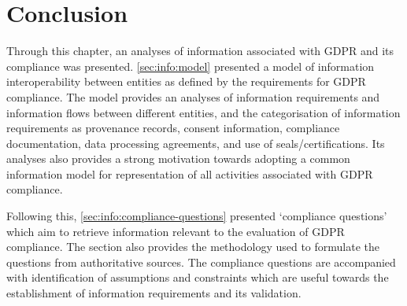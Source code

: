 \section*{Conclusion}
Through this chapter, an analyses of information associated with GDPR and its compliance was presented. 
\autoref{sec:info:model} presented a model of information interoperability between entities as defined by the requirements for GDPR compliance. The model provides an analyses of information requirements and information flows between different entities, and the categorisation of information requirements as provenance records, consent information, compliance documentation, data processing agreements, and use of seals/certifications.
Its analyses also provides a strong motivation towards adopting a common information model for representation of all activities associated with GDPR compliance.

Following this, \autoref{sec:info:compliance-questions} presented `compliance questions' which aim to retrieve information relevant to the evaluation of GDPR compliance. The section also provides the methodology used to formulate the questions from authoritative sources. The compliance questions are accompanied with identification of assumptions and constraints which are useful towards the establishment of information requirements and its validation.